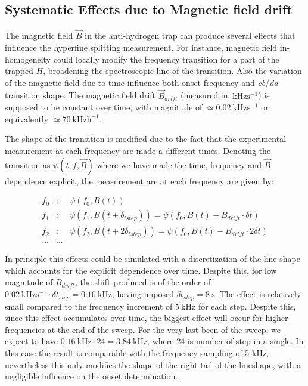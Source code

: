 \documentclass[11pt,a4paper,oneside]{article}
\begin{document}
\newpage
\subsection{Systematic Effects due to Magnetic field drift}

The magnetic field $\vec{B}$ in the anti-hydrogen trap can produce several effects that influence the hyperfine splitting measurement. For instance, magnetic field in-homogeneity could locally modify the frequency transition for a part of the trapped $\overline{H}$, broadening the spectroscopic line of the transition. Also
the variation of the magnetic field due to time influence both onset frequency and \textit{cb}/\textit{da} transition shape. The magnetic field drift $\vec{B}_{drift}$ (measured in $\SI{}{\kilo \hertz \second\tothe{-1}}$) is supposed to be constant over time, with magnitude of $ \simeq \SI{0.02}{\kilo \hertz \second\tothe{-1}}$ or equivalently $ \simeq \SI{70}{\kilo \hertz \hour\tothe{-1}}$.

The shape of the transition  is modified due to the fact that the experimental measurement at each frequency are made a different times. Denoting the transition as $\psi(t,f,\vec{B})$ where we have made the time, frequency and $\vec{B}$ dependence explicit, the measurement are at each frequency are given by:

\begin{eqnarray*}
f_{0}& : &\psi(f_{0},B(t))   \\
f_{1}& : &\psi(f_{1},B(t + \delta_{tstep})) = \psi(f_{0},B(t) - B_{drift} \cdot \delta t) \\
f_{2}& : &\psi(f_{2},B(t + 2\delta_{tstep})) = \psi(f_{0},B(t) - B_{drift} \cdot 2 \delta t)\\
... & ...
\end{eqnarray*}

In principle this effects could be simulated with a discretization of the line-shape which accounts for the explicit dependence over time. Despite this, for low magnitude of $B_{drift}$, the shift produced is of the order of $\SI{0.02}{\kilo \hertz \second \tothe{-1}} \cdot \delta t_{step} = \SI{0.16}{\kilo \hertz}$, having imposed $\delta t_{step} =\SI{8}{\second}$. The effect is relatively small compared to the frequency increment of $\SI{5}{\kilo \hertz}$ for each step. Despite this, since this effect accumulates over time, the biggest effect will occur for higher frequencies at the end of the sweep. For the very last been of the sweep, we expect to have $ \SI{0.16}{\kilo \hertz} \cdot 24  = \SI{3.84}{\kilo \hertz} $, where 24 is number of step in a single. In this case the result is comparable with the frequency sampling of 5 kHz, nevertheless this only modifies the shape of the right tail of the lineshape, with a negligible influence on the onset determination.
\end{document}
